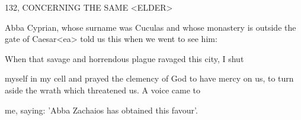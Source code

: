132, CONCERNING THE SAME <ELDER>

Abba Cyprian, whose surname was Cuculas and whose monastery
is outside the gate of Caesar<ea> told us this when we went to see
him:

When that savage and horrendous plague ravaged this city, I shut

myself in my cell and prayed the clemency of God to have mercy on
us, to turn aside the wrath which threatened us. A voice came to

me, saying: 'Abba Zachaios has obtained this favour'.

